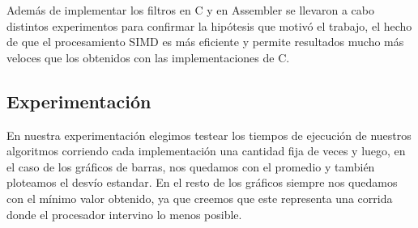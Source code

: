 \par{Además de implementar los filtros en C y en Assembler se llevaron a cabo distintos experimentos para confirmar la hipótesis que motivó el trabajo, el hecho de que el procesamiento SIMD es más eficiente y permite resultados mucho más veloces que los obtenidos con las implementaciones de C.}

\subsection{Experimentación}
\par{En nuestra experimentación elegimos testear los tiempos de ejecución de nuestros algoritmos corriendo cada implementación una cantidad fija de veces y luego, en el caso de los gráficos de barras, nos quedamos con el promedio y también ploteamos el desvío estandar. En el resto de los gráficos siempre nos quedamos con el mínimo valor obtenido, ya que creemos que este representa una corrida donde el procesador intervino lo menos posible.}